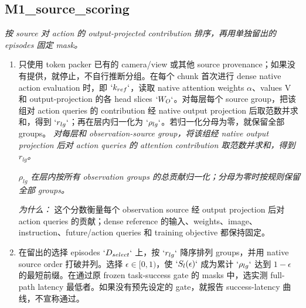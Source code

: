 \documentclass[10pt,a4paper]{article}
\begin{document}
\subsection*{M1\_source\_scoring}
\emph{按 source 对 action 的 output-projected contribution 排序，再用单独留出的 episodes 固定 mask。}
\begin{enumerate}[leftmargin=*,start=3]
  \item 只使用 token packer 已有的 camera/view 或其他 source provenance；如果没有提供，就停止，不自行推断分组。在每个 chunk 首次进行 dense native action evaluation 时，即 \(`k_{ref}`\)，读取 native attention weights \(\alpha \)、values V 和 output-projection 的各 head slices \(`W_{O}`\)。对每层每个 source group，把该组对 action queries 的 contribution 经 native output projection 后取范数并求和，得到 \(`r_{lg}`\)；再在层内归一化为 \(`\rho _{lg}`\)。若归一化分母为零，就保留全部 groups。
\noindent\emph{对每层和 observation-source group，将该组经 native output projection 后对 action queries 的 attention contribution 取范数并求和，得到 \(r_{lg}\)。}
\par{}
\noindent\emph{\(\rho _{lg}\) 在层内按所有 observation groups 的总贡献归一化；分母为零时按规则保留全部 groups。}
\par{}
\par\emph{为什么：} 这个分数衡量每个 observation source 经 output projection 后对 action queries 的贡献；dense reference 的输入、weights、image、instruction、future/action queries 和 training objective 都保持固定。
  \item 在留出的选择 episodes \(`D_{select}`\) 上，按 \(`r_{lg}`\) 降序排列 groups，并用 native source order 打破并列。选择 \(\epsilon \in [0,1)\)，使 \(`S_{l}(\epsilon )`\) 成为累计 \(`\rho _{lg}`\) 达到 \(1- \epsilon \) 的最短前缀。在通过原 frozen task-success gate 的 masks 中，选实测 full-path latency 最低者。如果没有预先设定的 gate，就报告 success-latency 曲线，不宣称通过。

\end{enumerate}
\end{document}
